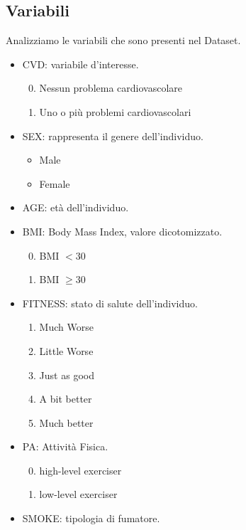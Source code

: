 \documentclass{article}\usepackage[]{graphicx}\usepackage[]{xcolor}
\begin{document}
  \subsection{Variabili}
    Analizziamo le variabili che sono presenti nel Dataset.
    \begin{itemize}
      \item CVD: variabile d'interesse.
        \begin{enumerate}
          \setcounter{enumi}{-1}
          \item Nessun problema cardiovascolare
          \item Uno o più problemi cardiovascolari
        \end{enumerate}
      \item SEX: rappresenta il genere dell'individuo.
        \begin{itemize}
          \item Male
          \item Female
        \end{itemize}
      \item AGE: età dell'individuo.
      \item BMI: Body Mass Index, valore dicotomizzato.
        \begin{enumerate}
          \setcounter{enumi}{-1}
          \item BMI $< 30$
          \item BMI $\ge 30$ 
        \end{enumerate}
      \item FITNESS: stato di salute dell'individuo.
        \begin{enumerate}
          \item Much Worse 
          \item Little Worse
          \item Just as good
          \item A bit better
          \item Much better
        \end{enumerate}
      \item PA: Attività Fisica.
        \begin{enumerate}
          \setcounter{enumi}{-1}
          \item high-level exerciser 
          \item low-level exerciser
        \end{enumerate}
      \item SMOKE: tipologia di fumatore.
        \begin{itemize}

\end{itemize}
\end{itemize}
\end{document}
